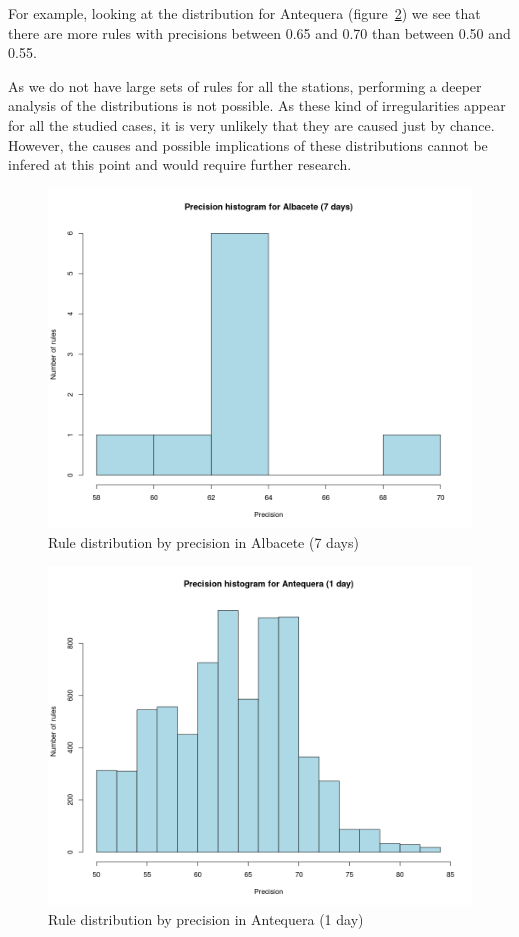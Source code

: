 \documentclass[a4paper,12pt]{article}
\begin{document}
For example, looking at the distribution for Antequera (figure~\ref{fig:hist_ant1}) we see that there are more rules with precisions between 0.65 and 0.70 than between 0.50 and 0.55.

As we do not have large sets of rules for all the stations, performing a deeper analysis of the distributions is not possible. As these kind of irregularities appear for all the studied cases, it is very unlikely that they are caused just by chance. However, the causes and possible implications of these distributions cannot be infered at this point and would require further research.

\begin{figure}[hbtp]
\includegraphics[width=\textwidth]{img/hist_alb7.png}
\caption{Rule distribution by precision in Albacete (7 days)} \label{fig:hist_alb7}
\end{figure}

\begin{figure}[hbtp]
\includegraphics[width=\textwidth]{img/hist_ant1.png}
\caption{Rule distribution by precision in Antequera (1 day)} \label{fig:hist_ant1}
\end{figure}
\end{document}
